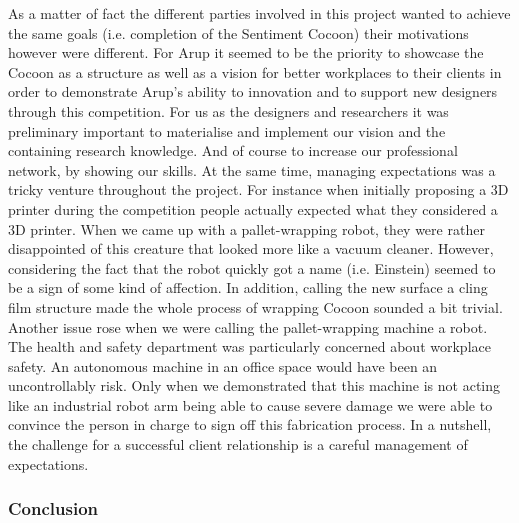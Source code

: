 As a matter of fact the different parties involved in this project wanted to achieve the same goals (i.e. completion of the Sentiment Cocoon) their motivations however were different. For Arup it seemed to be the priority to showcase the Cocoon as a structure as well as a vision for better workplaces to their clients in order to demonstrate Arup’s ability to innovation and to support new designers through this competition.
For us as the designers and researchers it was preliminary important to materialise and implement our vision and the containing research knowledge. And of course to increase our professional network, by showing our skills. 
At the same time, managing expectations was a tricky venture throughout the project. For instance when initially proposing a 3D printer during the competition people actually expected what they considered a 3D printer. When we came up with a pallet-wrapping robot, they were rather disappointed of this creature that looked more like a vacuum cleaner. However, considering the fact that the robot quickly got a name (i.e. Einstein) seemed to be a sign of some kind of affection. In addition, calling the new surface a cling film structure made the whole process of wrapping Cocoon sounded a bit trivial. 
Another issue rose when we were calling the pallet-wrapping machine a robot. The health and safety department was particularly concerned about workplace safety. An autonomous machine in an office space would have been an uncontrollably risk. Only when we demonstrated that this machine is not acting like an industrial robot arm being able to cause severe damage we were able to convince the person in charge to sign off this fabrication process.
In a nutshell, the challenge for a successful client relationship is a careful management of expectations.

\subsubsection{Conclusion}

